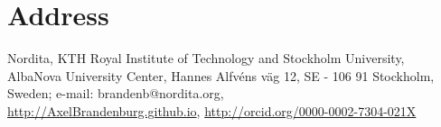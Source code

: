\documentclass{article}
\begin{document}
\section*{Address}
% 
% 
% 
% 
%


\vspace{-2mm}\noindent
Nordita, KTH Royal Institute of Technology and Stockholm University,
AlbaNova University Center,
Hannes Alfv\'ens v\"ag 12, SE - 106 91 Stockholm, Sweden;
e-mail: {\sf brandenb@nordita.org},\\
\quad\url{http://AxelBrandenburg.github.io},
\quad\url{http://orcid.org/0000-0002-7304-021X}
\end{document}
